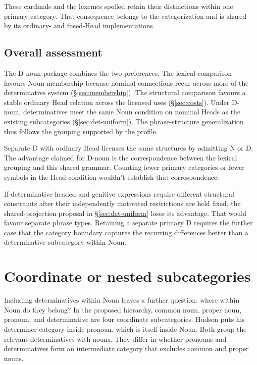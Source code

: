 \documentclass[12pt]{article}
\begin{document}
These cardinals and the lexemes spelled  retain their distinctions within one primary category. That consequence belongs to the categorization and is shared by its ordinary- and fused-Head implementations.

\subsection{Overall assessment}\label{sec:overall-assessment}

The D-noun package combines the two preferences. The lexical comparison favours Noun membership because nominal connections recur across more of the determinative system (§\ref{sec:membership}). The structural comparison favours a stable ordinary Head relation across the licensed uses (§\ref{sec:costs}). Under D-noun, determinatives meet the same Noun condition on nominal Heads as the existing subcategories (§\ref{sec:det-uniform}). The phrase-structure generalization thus follows the grouping supported by the profile.

Separate D with ordinary Head licenses the same structures by admitting N or D. The advantage claimed for D-noun is the correspondence between the lexical grouping and this shared grammar. Counting fewer primary categories or fewer symbols in the Head condition wouldn't establish that correspondence.

If determinative-headed and genitive expressions require different structural constraints after their independently motivated restrictions are held fixed, the shared-projection proposal in §\ref{sec:det-uniform} loses its advantage. That would favour separate phrase types. Retaining a separate primary D requires the further case that the category boundary captures the recurring differences better than a determinative subcategory within Noun.

\section{Coordinate or nested subcategories}\label{sec:inheritance}

Including determinatives within Noun leaves a further question: where within Noun do they belong? In the proposed hierarchy, common noun, proper noun, pronoun, and determinative are four coordinate subcategories. Hudson puts his determiner category inside pronoun, which is itself inside Noun. Both group the relevant determinatives with nouns. They differ in whether pronouns and determinatives form an intermediate category that excludes common and proper nouns.
\end{document}
